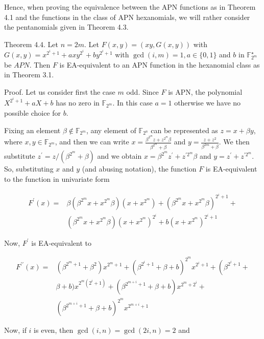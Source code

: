 \documentclass[10pt]{article}
\begin{document}
Hence, when proving the equivalence between the APN functions as in Theorem 4.1 and the functions in the class of APN hexanomials, we will rather consider the pentanomials given in Theorem 4.3.

Theorem 4.4. Let $n=2 m$. Let $F(x, y)=(x y, G(x, y))$ with $G(x, y)= x^{2^{i}+1}+a x y^{2^{i}}+b y^{2^{i}+1}$ with $\operatorname{gcd}(i, m)=1, a \in\{0,1\}$ and $b$ in $\mathbb{F}_{2^{m}}^{\star}$ be $A P N$. Then $F$ is EA-equivalent to an APN function in the hexanomial class as in Theorem 3.1.

Proof. Let us consider first the case $m$ odd. Since $F$ is APN, the polynomial $X^{2^{i}+1}+a X+b$ has no zero in $\mathbb{F}_{2^{m}}$. In this case $a=1$ otherwise we have no possible choice for $b$.

Fixing an element $\beta \notin \mathbb{F}_{2^{m}}$, any element of $\mathbb{F}_{2^{n}}$ can be represented as $z=x+\beta y$, where $x, y \in \mathbb{F}_{2^{m}}$, and then we can write $x=\frac{\beta^{2^{m}} z+z^{2^{m}} \beta}{\beta^{2^{m}}+\beta}$ and $y= \frac{z+z^{2}}{\beta^{2 m}+\beta}$. We then substitute $z^{\prime}=z /\left(\beta^{2^{m}}+\beta\right)$ and we obtain $x=\beta^{2^{m}} z^{\prime}+z^{\prime 2^{m}} \beta$ and $y=z^{\prime}+z^{\prime 2^{m}}$. So, substituting $x$ and $y$ (and abusing notation), the function $F$ is EA-equivalent to the function in univariate form

$$
\begin{aligned}
F^{\prime}(x)= & \beta\left(\beta^{2^{m}} x+x^{2^{m}} \beta\right)\left(x+x^{2^{m}}\right)+\left(\beta^{2^{m}} x+x^{2^{m}} \beta\right)^{2^{i}+1}+ \\
& \left(\beta^{2^{m}} x+x^{2^{m}} \beta\right)\left(x+x^{2^{m}}\right)^{2^{i}}+b\left(x+x^{2^{m}}\right)^{2^{i}+1}
\end{aligned}
$$

Now, $F^{\prime}$ is EA-equivalent to

$$
\begin{aligned}
F^{\prime \prime}(x)= & \left(\beta^{2^{m}+1}+\beta^{2}\right) x^{2^{m}+1}+\left(\beta^{2^{i}+1}+\beta+b\right)^{2^{m}} x^{2^{i}+1}+\left(\beta^{2^{i}+1}+\right. \\
& \beta+b) x^{2^{m}\left(2^{i}+1\right)}+\left(\beta^{2^{m+i}+1}+\beta+b\right) x^{2^{m}+2^{i}}+ \\
& \left(\beta^{2^{m+i}+1}+\beta+b\right)^{2^{m}} x^{2^{m+i}+1}
\end{aligned}
$$

Now, if $i$ is even, then $\operatorname{gcd}(i, n)=\operatorname{gcd}(2 i, n)=2$ and
\end{document}
